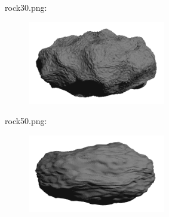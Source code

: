 rock30.png:\\
\begin{center}
\begin{figure}[H]
\centering\includegraphics[width=6cm]{./rock30.png}\\
\end{figure}
\end{center}

rock50.png:\\
\begin{center}
\begin{figure}[H]
\centering\includegraphics[width=6cm]{./rock50.png}\\
\end{figure}
\end{center}

